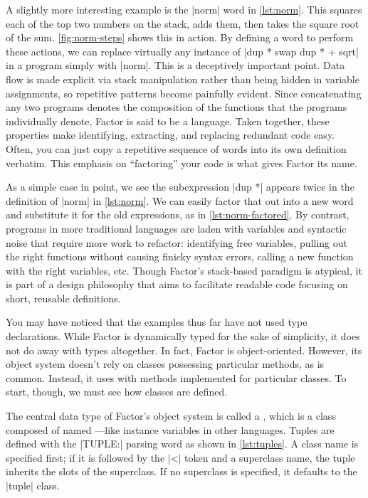 A slightly more interesting example is the \factor|norm| word in
\vref{lst:norm}.  This squares each of the top two numbers on the stack, adds
them, then takes the square root of the sum.  \vref{fig:norm-steps} shows this
in action.  By defining a word to perform these actions, we can replace
virtually any instance of
%
\factor|dup * swap dup * + sqrt|
%
in a program simply with \factor|norm|.  This is a deceptively important point.
Data flow is made explicit via stack manipulation rather than being hidden in
variable assignments, so repetitive patterns become painfully evident.  Since
concatenating any two programs denotes the composition of the functions that
the programs individually denote, Factor is said to be a 
language.  Taken together, these properties make identifying,
extracting, and replacing redundant code easy.  Often, you can just copy a
repetitive sequence of words into its own definition verbatim.  This emphasis
on ``factoring'' your code is what gives Factor its name.


As a simple case in point, we see the subexpression \factor|dup *| appears
twice in the definition of \factor|norm| in \vref{lst:norm}.  We can easily
factor that out into a new word and substitute it for the old expressions, as
in \vref{lst:norm-factored}.  By contrast, programs in more traditional
languages are laden with variables and syntactic noise that require more work
to refactor: identifying free variables, pulling out the right functions
without causing finicky syntax errors, calling a new function with the right
variables, etc.  Though Factor's stack-based paradigm is atypical, it is part
of a design philosophy that aims to facilitate readable code focusing on short,
reusable definitions.


You may have noticed that the examples thus far have not used type
declarations.  While Factor is dynamically typed for the sake of simplicity, it
does not do away with types altogether.  In fact, Factor is object-oriented.
However, its object system doesn't rely on classes possessing particular
methods, as is common.  Instead, it uses  with methods
implemented for particular classes.  To start, though, we must see how classes
are defined.

The central data type of Factor's object system is called a , which
is a class composed of named ---like instance variables in other
languages.  Tuples are defined with the \factor|TUPLE:| parsing word as shown
in \vref{lst:tuples}.  A class name is specified first; if it is followed by
the \factor|<| token and a superclass name, the tuple inherits the slots of the
superclass.  If no superclass is specified, it defaults to the \factor|tuple|
class.

